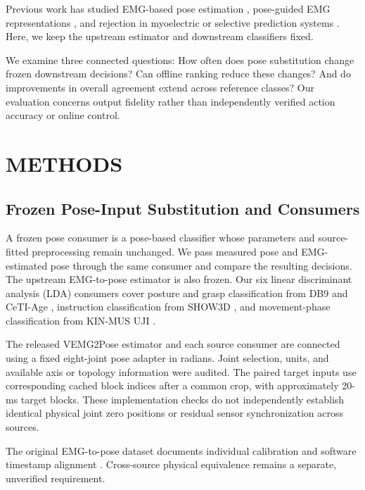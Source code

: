 \documentclass[conference,letterpaper]{IEEEtran}
\begin{document}
Previous work has studied EMG-based pose estimation \cite{salter2024emg2pose}, pose-guided EMG representations \cite{cui2025cpep,cui2026embridge}, and rejection in myoelectric or selective prediction systems \cite{scheme2013confidence,ahkami2023rejection,geifman2019selectivenet}. Here, we keep the upstream estimator and downstream classifiers fixed.

We examine three connected questions: How often does pose substitution change frozen downstream decisions? Can offline ranking reduce these changes? And do improvements in overall agreement extend across reference classes? Our evaluation concerns output fidelity rather than independently verified action accuracy or online control.

\section{METHODS}\label{methods}


\subsection{Frozen Pose-Input Substitution and Consumers}\label{frozen-pose-input-substitution-and-consumers}
A frozen pose consumer is a pose-based classifier whose parameters and source-fitted preprocessing remain unchanged. We pass measured pose and EMG-estimated pose through the same consumer and compare the resulting decisions. The upstream EMG-to-pose estimator is also frozen. Our six linear discriminant analysis (LDA) consumers cover posture and grasp classification from DB9 \cite{jarquebou2020db9} and CeTI-Age \cite{muschter2023ceti}, instruction classification from SHOW3D \cite{rim2026show3d}, and movement-phase classification from KIN-MUS UJI \cite{jarquebou2019kinmus}.

The released VEMG2Pose estimator \cite{salter2024emg2pose} and each source consumer are connected using a fixed eight-joint pose adapter in radians. Joint selection, units, and available axis or topology information were audited. The paired target inputs use corresponding cached block indices after a common crop, with approximately 20-ms target blocks. These implementation checks do not independently establish identical physical joint zero positions or residual sensor synchronization across sources.

The original EMG-to-pose dataset documents individual calibration and software timestamp alignment \cite{salter2024emg2pose}. Cross-source physical equivalence remains a separate, unverified requirement.
\end{document}
